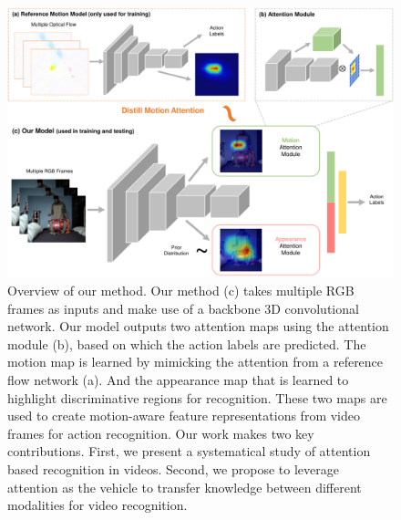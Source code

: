 \documentclass[10pt,twocolumn,letterpaper]{article}
\begin{document}
\begin{figure}[t]
\centering
\includegraphics[width=0.8\linewidth]{figures/overview.pdf}
\caption{Overview of our method. Our method (c) takes multiple RGB frames as inputs and make use of a backbone 3D convolutional network. Our model outputs two attention maps using the attention module (b), based on which the action labels are predicted. The motion map is learned by mimicking the attention from a reference flow network (a). And the appearance map that is learned to highlight discriminative regions for recognition. These two maps are used to create motion-aware feature representations from video frames for action recognition. Our work makes two key contributions. First, we present a systematical study of attention based recognition in videos. Second, we propose to leverage attention as the vehicle to transfer knowledge between different modalities for video recognition.} 
\label{fig:flowchart}
\vspace{-1.0em}
\end{figure}
\end{document}
